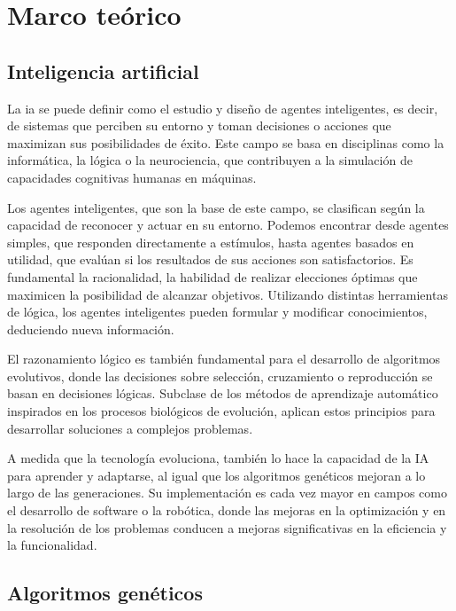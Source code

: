 \chapter{Marco teórico}
\label{ch:marco-teorico}

\section{Inteligencia artificial}

La \gls{ia} se puede definir como el estudio y diseño de agentes inteligentes, es decir, de sistemas que perciben su entorno y toman decisiones o acciones que maximizan sus posibilidades de éxito. Este campo se basa en disciplinas como la informática, la lógica o la neurociencia, que contribuyen a la simulación de capacidades cognitivas humanas en máquinas.

Los agentes inteligentes, que son la base de este campo, se clasifican según la capacidad de reconocer y actuar en su entorno. Podemos encontrar desde agentes simples, que responden directamente a estímulos, hasta agentes basados en utilidad, que evalúan si los resultados de sus acciones son satisfactorios. Es fundamental la racionalidad, la habilidad de realizar elecciones óptimas que maximicen la posibilidad de alcanzar objetivos. Utilizando distintas herramientas de lógica, los agentes inteligentes pueden formular y modificar conocimientos, deduciendo nueva información.

El razonamiento lógico es también fundamental para el desarrollo de algoritmos evolutivos, donde las decisiones sobre selección, cruzamiento o reproducción se basan en decisiones lógicas. Subclase de los métodos de aprendizaje automático inspirados en los procesos biológicos de evolución, aplican estos principios para desarrollar soluciones a complejos problemas.

A medida que la tecnología evoluciona, también lo hace la capacidad de la IA para aprender y adaptarse, al igual que los algoritmos genéticos mejoran a lo largo de las generaciones. Su implementación es cada vez mayor en campos como el desarrollo de software o la robótica, donde las mejoras en la optimización y en la resolución de los problemas conducen a mejoras significativas en la eficiencia y la funcionalidad.


\section{Algoritmos genéticos}


